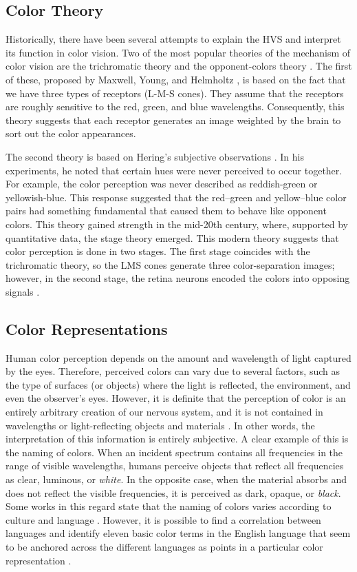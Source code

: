 \subsection{Color Theory}
Historically, there have been several attempts to explain the HVS and interpret its function in color vision. Two of the most popular theories of the mechanism of color vision are the trichromatic theory and the opponent-colors theory \citep{Fairchild:Book:2005}. The first of these, proposed by Maxwell, Young, and Helmholtz \citep{Young:PTRSL:1802, VonHelmholtz:Book:1867}, is based on the fact that we have three types of receptors (L-M-S cones). They assume that the receptors are roughly sensitive to the red, green, and blue wavelengths. Consequently, this theory suggests that each receptor generates an image weighted by the brain to sort out the color appearances.

The second theory is based on Hering's subjective observations \citep{Hering:Book:1878}. In his experiments, he noted that certain hues were never perceived to occur together. For example, the color perception was never described as reddish-green or yellowish-blue. This response suggested that the red–green and yellow–blue color pairs had something fundamental that caused them to behave like opponent colors. 
This theory gained strength in the mid-20th century, where, supported by quantitative data, the stage theory emerged. This modern theory suggests that color perception is done in two stages. The first stage coincides with the trichromatic theory, so the LMS cones generate three color-separation images; however, in the second stage, the retina neurons encoded the colors into opposing signals \citep{Fairchild:Book:2005}. 

\subsection{Color Representations}
Human color perception depends on the amount and wavelength of light captured by the eyes. Therefore, perceived colors can vary due to several factors, such as the type of surfaces (or objects) where the light is reflected, the environment, and even the observer's eyes. However, it is definite that the perception of color is an entirely arbitrary creation of our nervous system, and it is not contained in wavelengths or light-reflecting objects and materials \citep{Goldstein:Book:2009}. In other words, the interpretation of this information is entirely subjective. A clear example of this is the naming of colors. When an incident spectrum contains all frequencies in the range of visible wavelengths, humans perceive objects that reflect all frequencies as clear, luminous, or \textit{white}. In the opposite case, when the material absorbs and does not reflect the visible frequencies, it is perceived as dark, opaque, or \textit{black}. Some works in this regard state that the naming of colors varies according to culture and language \citep{Berlin.Kay:Book:1991}. However, it is possible to find a correlation between languages and identify eleven basic color terms in the English language that seem to be anchored across the different languages as points in a particular color representation \citep{Kay.Regier:PNAS:2003}.%

